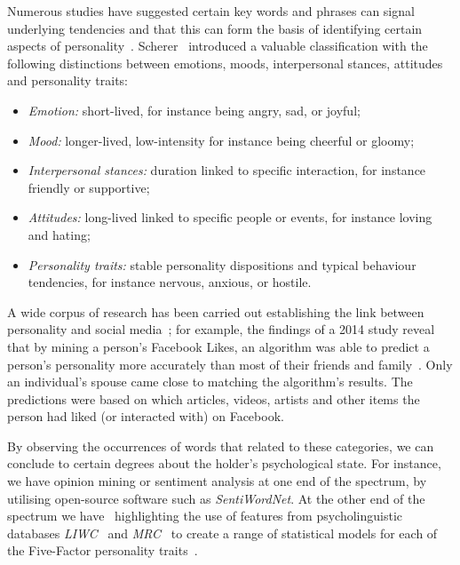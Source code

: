 \documentclass[conference]{IEEEtran}
\begin{document}
Numerous studies have suggested certain key words and phrases can
signal underlying tendencies and that this can form the basis of
identifying certain aspects of
personality~\cite{woodworth-et-al:2012,iacobelli-et-al:2011,pennebaker+king:1999,oberlander+gill:2004,oberlander+gill:2006}. Scherer~\cite{scherer:1984}
introduced a valuable classification with the following distinctions
between emotions, moods, interpersonal stances, attitudes and
personality traits:

\begin{itemize}
\item {\emph{Emotion:}} short-lived, for instance being angry, sad, or joyful;
\item {\emph{Mood:}} longer-lived, low-intensity for instance being cheerful or gloomy;
\item {\emph{Interpersonal stances:}} duration linked to specific
  interaction, for instance friendly or supportive;
\item {\emph{Attitudes:}} long-lived linked to specific people or
  events, for instance loving and hating;
\item {\emph{Personality traits:}} stable personality dispositions and
  typical behaviour tendencies, for instance nervous, anxious, or hostile.
\end{itemize}

A wide corpus of research has been carried out establishing the link
between personality and social
media~\cite{vazire+gosling:2004,iacobelli-et-al:2011,blamey-et-al-2012,blamey-et-al-2013};
for example, the findings of a 2014 study reveal that by mining a
person's Facebook Likes, an algorithm was able to predict a person's
personality more accurately than most of their friends and
family~\cite{youyou-et-al:2014}. Only an individual's spouse came
close to matching the algorithm's results. The predictions were based
on which articles, videos, artists and other items the person had
liked (or interacted with) on Facebook.

By observing the occurrences of words that related to these
categories, we can conclude to certain degrees about the holder's
psychological state. For instance, we have opinion mining or sentiment
analysis at one end of the spectrum, by utilising open-source software
such as {\emph{SentiWordNet}}. At the other end of the spectrum we
have~\cite{mairesse-et-al:2007} highlighting the use of features from
psycholinguistic databases {\emph{LIWC}}~\cite{pennebaker-et-al:2001}
and {\emph{MRC}}~\cite{wilson:1988} to create a range of statistical
models for each of the Five-Factor personality
traits~\cite{norman:1963,peabody+goldberg:1989}.
\end{document}

